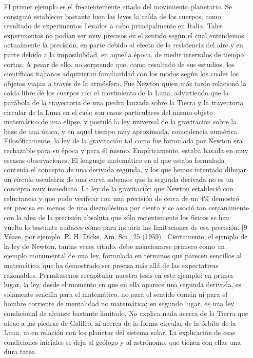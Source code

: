 \documentclass[a4paper, 12pt]{article}
\begin{document}
El primer ejemplo es el frecuentemente citado del movimiento planetario. Se consiguió establecer bastante bien las leyes la caída de los cuerpos, como resultado de experimentos llevados a cabo principalmente en Italia. Tales experimentos no podían ser muy precisos en el sentido según el cual entendemos actualmente la precisión, en parte debido al efecto de la resistencia del aire y en parte debido a la imposibilidad, en aquella época, de medir intervalos de tiempo cortos. A pesar de ello, no sorprende que, como resultado de sus estudios, los científicos italianos adquirieran familiaridad con los modos según los cuales los objetos viajan a través de la atmósfera. Fue Newton quien más tarde relacionó la caída libre de los cuerpos con el movimiento de la Luna, advirtiendo que la parábola de la trayectoria de una piedra lanzada sobre la Tierra y la trayectoria circular de la Luna en el cielo son casos particulares del mismo objeto matemático de una elipse, y postuló la ley universal de la gravitación sobre la base de una única, y en aquel tiempo muy aproximada, coincidencia numérica. Filosóficamente, la ley de la gravitación tal como fue formulada por Newton era rechazable para su época y para él mismo. Empíricamente, estaba basada en muy escasas observaciones. El lenguaje matemático en el que estaba formulada contenía el concepto de una derivada segunda, y los que hemos intentado dibujar un círculo osculatriz de una curva sabemos que la segunda derivada no es un concepto muy inmediato. La ley de la gravitación que Newton estableció con reluctancia y que pudo verificar con una precisión de cerca de un 4\% demostró ser precisa en menos de una diezmilésima por ciento y se asoció tan cercanamente con la idea de la precisión absoluta que sólo recientemente los físicos se han vuelto lo bastante audaces como para inquirir las limitaciones de esa precisión. [9 Véase, por ejemplo, R. H. Dicke, Am. Sci., 25 (1959).] Ciertamente, el ejemplo de la ley de Newton, tantas veces citado, debe mencionarse primero como un ejemplo monumental de una ley, formulada en términos que parecen sencillos al matemático, que ha demostrado ser precisa más allá de las expectativas razonables. Permítasenos recapitular nuestra tesis en este ejemplo: en primer lugar, la ley, desde el momento en que en ella aparece una segunda derivada, es solamente sencilla para el matemático, no para el sentido común ni para el hombre corriente de mentalidad no matemática; en segundo lugar, es una ley condicional de alcance bastante limitado. No explica nada acerca de la Tierra que atrae a las piedras de Galileo, ni acerca de la forma circular de la órbita de la Luna, ni en relación con los planetas del sistema solar. La explicación de esas condiciones iniciales se deja al geólogo y al astrónomo, que tienen con ellas una dura tarea.
\end{document}
